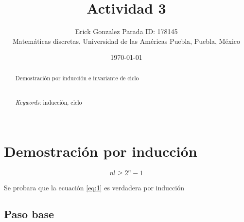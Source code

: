 \documentclass{article}
\begin{document}
\renewcommand{\footrulewidth}{1pt}
\renewcommand{\tablename}{Tabla}
\renewcommand{\figurename}{Figura}


\title{Actividad 3}
\author{\small{Erick Gonzalez Parada ID: 178145}\\
	   \small{Matemáticas discretas, Universidad de las Américas Puebla, Puebla, M\'exico}}
\date{\small{\today}}
\maketitle


\begin{abstract}
Demostración por inducción e invariante de ciclo\\
\\
\\
{\it Keywords:} inducción, ciclo
\\
\\
\end{abstract}

\section{Demostración por inducción}\label{Dpi}
\begin{equation}
  n! \geq 2^n-1
 \label{eq:1} 
\end{equation}

Se probara que la ecuación \ref{eq:1} es verdadera por inducción 

\subsection*{Paso base}\label{Pb}
\end{document}
